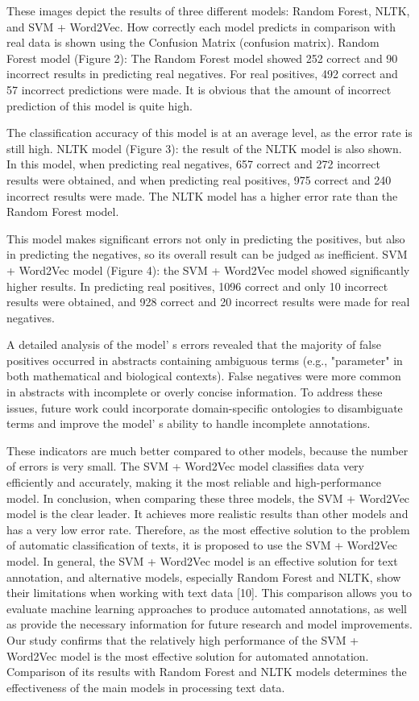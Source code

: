 \begin{multicols}{2}
These images depict the results of three different models: Random
Forest, NLTK, and SVM + Word2Vec. How correctly each model predicts in
comparison with real data is shown using the Confusion Matrix (confusion
matrix). Random Forest model (Figure 2): The Random Forest model showed
252 correct and 90 incorrect results in predicting real negatives. For
real positives, 492 correct and 57 incorrect predictions were made. It
is obvious that the amount of incorrect prediction of this model is
quite high.

The classification accuracy of this model is at an average level, as the
error rate is still high. NLTK model (Figure 3): the result of the NLTK
model is also shown. In this model, when predicting real negatives, 657
correct and 272 incorrect results were obtained, and when predicting
real positives, 975 correct and 240 incorrect results were made. The
NLTK model has a higher error rate than the Random Forest model.

This model makes significant errors not only in predicting the
positives, but also in predicting the negatives, so its overall result
can be judged as inefficient. SVM + Word2Vec model (Figure 4): the SVM +
Word2Vec model showed significantly higher results. In predicting real
positives, 1096 correct and only 10 incorrect results were obtained, and
928 correct and 20 incorrect results were made for real negatives.

A detailed analysis of the model' s errors revealed that
the majority of false positives occurred in abstracts containing
ambiguous terms (e.g., "parameter" in both mathematical and biological
contexts). False negatives were more common in abstracts with incomplete
or overly concise information. To address these issues, future work
could incorporate domain-specific ontologies to disambiguate terms and
improve the model' s ability to handle incomplete
annotations.

These indicators are much better compared to other models, because the
number of errors is very small. The SVM + Word2Vec model classifies data
very efficiently and accurately, making it the most reliable and
high-performance model. In conclusion, when comparing these three
models, the SVM + Word2Vec model is the clear leader. It achieves more
realistic results than other models and has a very low error rate.
Therefore, as the most effective solution to the problem of automatic
classification of texts, it is proposed to use the SVM + Word2Vec model.
In general, the SVM + Word2Vec model is an effective solution for text
annotation, and alternative models, especially Random Forest and NLTK,
show their limitations when working with text data {[}10{]}. This
comparison allows you to evaluate machine learning approaches to produce
automated annotations, as well as provide the necessary information for
future research and model improvements. Our study confirms that the
relatively high performance of the SVM + Word2Vec model is the most
effective solution for automated annotation. Comparison of its results
with Random Forest and NLTK models determines the effectiveness of the
main models in processing text data.


\end{multicols}

